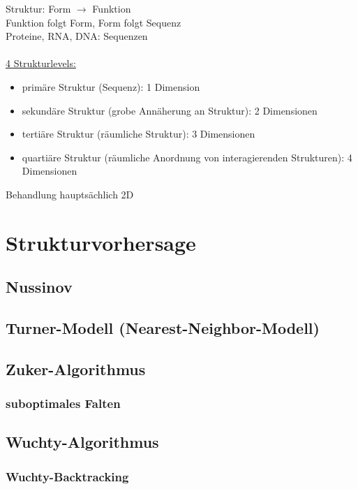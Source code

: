 \documentclass[12pt]{article}
\begin{document}
Struktur: Form $\rightarrow$ Funktion\\
Funktion folgt Form, Form folgt Sequenz\\
Proteine, RNA, DNA: Sequenzen\\
\\
\underline{4 Strukturlevels:}
\begin{itemize}
	\item primäre Struktur (Sequenz): 1 Dimension
	\item sekundäre Struktur (grobe Annäherung an Struktur): 2 Dimensionen
	\item tertiäre Struktur (räumliche Struktur): 3 Dimensionen
	\item quartiäre Struktur (räumliche Anordnung von interagierenden Strukturen): 4 Dimensionen
\end{itemize}

Behandlung hauptsächlich 2D

\section{Strukturvorhersage}

\subsection{Nussinov}

\subsection{Turner-Modell (Nearest-Neighbor-Modell)}

\subsection{Zuker-Algorithmus}

\subsubsection{suboptimales Falten}

\subsection{Wuchty-Algorithmus}

\subsubsection{Wuchty-Backtracking}
\end{document}
